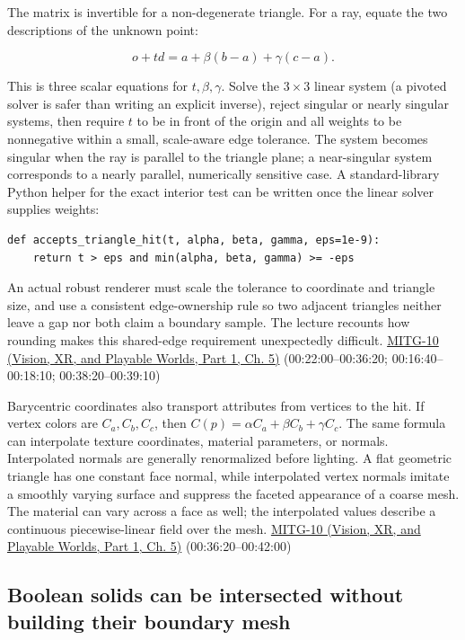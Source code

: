 The matrix is invertible for a non-degenerate triangle. For a ray, equate the two descriptions of the unknown point:

\[
o+td=a+\beta(b-a)+\gamma(c-a).
\]

This is three scalar equations for \(t,\beta,\gamma\). Solve the \(3\times3\) linear system (a pivoted solver is safer than writing an explicit inverse), reject singular or nearly singular systems, then require \(t\) to be in front of the origin and all weights to be nonnegative within a small, scale-aware edge tolerance. The system becomes singular when the ray is parallel to the triangle plane; a near-singular system corresponds to a nearly parallel, numerically sensitive case. A standard-library Python helper for the exact interior test can be written once the linear solver supplies weights:

\begin{verbatim}
def accepts_triangle_hit(t, alpha, beta, gamma, eps=1e-9):
    return t > eps and min(alpha, beta, gamma) >= -eps
\end{verbatim}

An actual robust renderer must scale the tolerance to coordinate and triangle size, and use a consistent edge-ownership rule so two adjacent triangles neither leave a gap nor both claim a boundary sample. The lecture recounts how rounding makes this shared-edge requirement unexpectedly difficult. \href{../07-Vision-XR-and-Playable-Worlds-P01/main.pdf\#nameddest=04-visual-computing-ii-ch036-mitg-10---ray-casting-ii}{MITG-10 (Vision, XR, and Playable Worlds, Part 1, Ch. 5)} (00:22:00--00:36:20; 00:16:40--00:18:10; 00:38:20--00:39:10)

Barycentric coordinates also transport attributes from vertices to the hit. If vertex colors are \(C_a,C_b,C_c\), then \(C(p)=\alpha C_a+\beta C_b+\gamma C_c\). The same formula can interpolate texture coordinates, material parameters, or normals. Interpolated normals are generally renormalized before lighting. A flat geometric triangle has one constant face normal, while interpolated vertex normals imitate a smoothly varying surface and suppress the faceted appearance of a coarse mesh. The material can vary across a face as well; the interpolated values describe a continuous piecewise-linear field over the mesh. \href{../07-Vision-XR-and-Playable-Worlds-P01/main.pdf\#nameddest=04-visual-computing-ii-ch036-mitg-10---ray-casting-ii}{MITG-10 (Vision, XR, and Playable Worlds, Part 1, Ch. 5)} (00:36:20--00:42:00)

\subsection{Boolean solids can be intersected without building their boundary mesh}\label{04-visual-computing-ii-ch028-boolean-solids-can-be-intersected-without-building-their-boundary-mesh}


